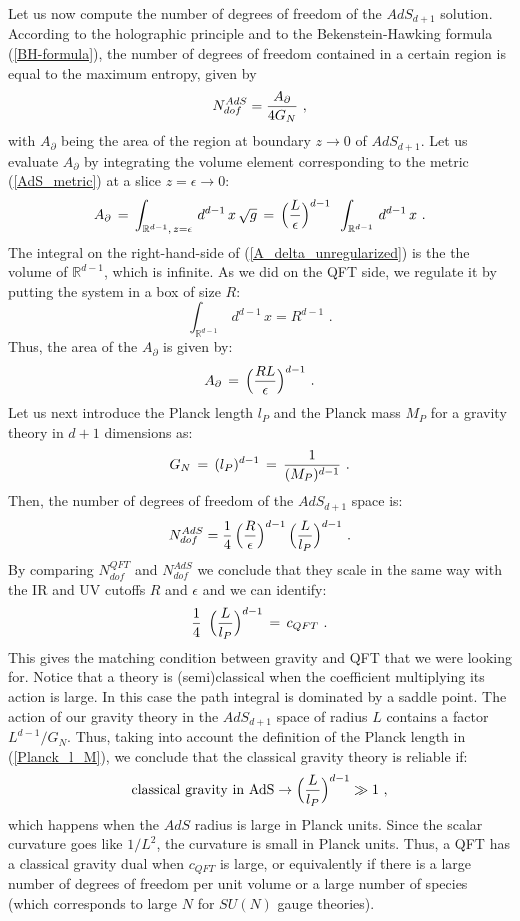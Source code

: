 \documentclass[12pt,notitlepage]{article}
\newcommand{\beq}{\begin{equation}}
\newcommand{\eeq}{\end{equation}}
\begin{document}
Let us now compute the number of degrees of freedom of the $AdS_{d+1}$ solution. According to the holographic principle and to the Bekenstein-Hawking formula (\ref{BH-formula}), the number of degrees of freedom contained in a certain region is equal to  the maximum entropy, given by
\beq
N_{dof}^{AdS}={A_{\partial}\over 4 G_N}\,\,,
\eeq
with $A_{\partial}$ being the area of the region at boundary $z\to 0$ of  $AdS_{d+1}$. Let us evaluate $A_{\partial}$ by integrating the volume element corresponding to the metric (\ref{AdS_metric}) at a slice $z=\epsilon\to 0$:
\beq
A_{\partial}\,=\,\int_{{\mathbb R}^{d-1},\, z=\epsilon}\,
 d^{d-1}\,x\,\sqrt{g}\,=\,\Big({L\over \epsilon}\Big)^{d-1}\,\
 \int_{{\mathbb R}^{d-1}}\, d^{d-1}\,x\,\,.
 \label{A_delta_unregularized}
 \eeq
The integral on the right-hand-side of (\ref{A_delta_unregularized}) is the
the volume of ${\mathbb R}^{d-1}$, which  is infinite. As we did on the QFT side, we regulate it by putting the system in  a box of size $R$:
\beq
\int_{{\mathbb R}^{d-1}}\, d^{d-1}\,x=R^{d-1}\,\,.
\eeq
Thus, the area of the $A_{\partial}$ is given by:
\beq
A_{\partial}\,=\,\Big({RL\over \epsilon}\Big)^{d-1}\,\,.
\eeq
Let us next  introduce the Planck length $l_P$ and the Planck mass $M_P$ for a gravity theory in $d+1$ dimensions  as:
\beq
G_N\,=\,(l_P)^{d-1}\,=\,{1\over (M_P)^{d-1}}\,\,.
\label{Planck_l_M}
\eeq
Then, the number of degrees of freedom of the $AdS_{d+1}$ space is:
\beq
N_{dof}^{AdS}={1\over 4}\, \Big({R\over \epsilon}\Big)^{d-1}\,
 \Big({L\over l_P}\Big)^{d-1}\,\,.
\eeq
By comparing $N_{dof}^{QFT}$ and $N_{dof}^{AdS}$  we conclude that they scale in the same way with the IR and UV cutoffs  $R$ and $\epsilon$ and we can identify:
\beq
{1\over 4}\,\,\, \Big({L\over l_P}\Big)^{d-1}\,=\,  c_{QFT}\,\,.
\label{holo_centralCharge}
 \eeq
This gives the matching  condition between gravity and QFT that we were looking for. Notice that a theory is (semi)classical when the coefficient multiplying its action is large. In this case the path integral is dominated by a saddle point. The action of our gravity theory in the $AdS_{d+1}$ space of radius $L$ contains a factor $ L^{d-1}/G_N$. 
Thus, taking into account the definition of the Planck length in (\ref{Planck_l_M}), we conclude that the classical  gravity theory is reliable if:
\beq
{\rm classical\,\, gravity\,\, in\,\, AdS}\to \Big({L\over l_P}\Big)^{d-1} \gg 1\,\,,
\eeq
which happens when the $AdS$ radius is large in Planck units. Since the scalar curvature 
goes like $1/L^2$, the curvature is small in Planck units. Thus, a QFT has a classical gravity dual when $c_{QFT}$ is large, or equivalently if there is a large number of degrees of freedom per unit volume or a large number of species (which corresponds to large $N$ for $SU(N)$ gauge theories). 
\end{document}
